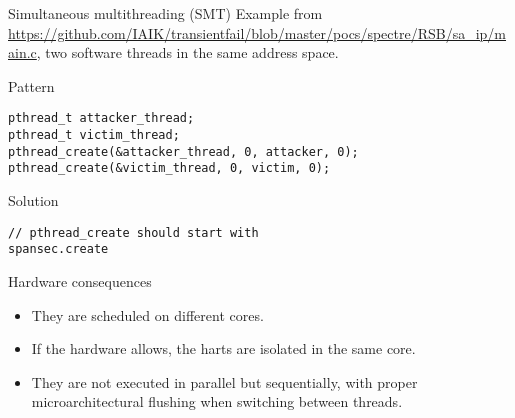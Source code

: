 \documentclass[11pt]{beamer}
\begin{document}
\begin{frame}{Simultaneous multithreading (SMT)}
        Example from \url{https://github.com/IAIK/transientfail/blob/master/pocs/spectre/RSB/sa_ip/main.c}, two software threads in the same address space.\\
\begin{block}{Pattern}
\begin{verbatim}
pthread_t attacker_thread;
pthread_t victim_thread;
pthread_create(&attacker_thread, 0, attacker, 0);
pthread_create(&victim_thread, 0, victim, 0);
\end{verbatim}
\end{block}

\begin{block}{Solution}
\begin{verbatim}
// pthread_create should start with
spansec.create
\end{verbatim}
\end{block}
\framebreak
\begin{alertblock}{Hardware consequences}
        \begin{itemize}
                \item They are scheduled on different cores.
                \item If the hardware allows, the harts are isolated in the same core.
                \item They are not executed in parallel but sequentially, with proper microarchitectural flushing when switching between threads.
        \end{itemize}
\end{alertblock}
\end{frame}
\end{document}
